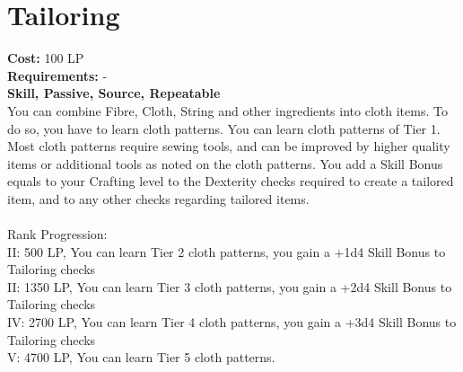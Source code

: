 \section{Tailoring}\label{perk:tailoring}
\textbf{Cost:} 100 LP\\
\textbf{Requirements:} -\\
\textbf{Skill, Passive, Source, Repeatable}\\
You can combine Fibre, Cloth, String and other ingredients into cloth items.
To do so, you have to learn cloth patterns.
You can learn cloth patterns of Tier 1.
Most cloth patterns require sewing tools, and can be improved by higher quality items or additional tools as noted on the cloth patterns.
You add a Skill Bonus equals to your Crafting level to the Dexterity checks required to create a tailored item, and to any other checks regarding tailored items.\\
\\
Rank Progression:\\
II: 500 LP, You can learn Tier 2 cloth patterns, you gain a +1d4 Skill Bonus to Tailoring checks\\
II: 1350 LP, You can learn Tier 3 cloth patterns, you gain a +2d4 Skill Bonus to Tailoring checks\\
IV: 2700 LP, You can learn Tier 4 cloth patterns, you gain a +3d4 Skill Bonus to Tailoring checks\\
V: 4700 LP, You can learn Tier 5 cloth patterns.\\